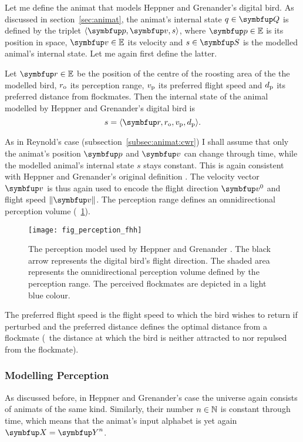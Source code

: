 Let me define the animat that models Heppner and Grenander's digital bird. As discussed in section~\ref{sec:animat}, the animat's internal state $q \in \set{Q}$ is defined by the triplet $\langle \vect{p}, \vect{v}, s \rangle$, where $\vect{p} \in \E$ is its position in space, $\vect{v} \in \E$ its velocity and $s \in \set{S}$ is the modelled animal's internal state. Let me again first define the latter. 

\begin{definition}
	\label{def:animat:s:fhh}
	Let $\vect{r} \in \E$ be the position of the centre of the roosting area of the the modelled bird, $r_\textnormal{o}$ its perception range, $v_\textnormal{p}$ its preferred flight speed and $d_\textnormal{p}$ its preferred distance from flockmates. Then the internal state of the animal modelled by Heppner and Grenander's digital bird is
	\begin{equation}
		s=\langle \vect{r}, r_\textnormal{o}, v_\textnormal{p}, d_\textnormal{p} \rangle.
	\end{equation}
\end{definition}

As in Reynold's case (subsection~\ref{subsec:animat:cwr}) I shall assume that only the animat's position $\vect{p}$ and $\vect{v}$ can change through time, while the 	modelled animal's internal state $s$ stays constant. This is again consistent with Heppner and Grenander's original definition \cite{heppner:1990}. The velocity vector $\vect{v}$ is thus again used to encode the flight direction $\vect{v}^0$ and flight speed $\left\|\vect{v}\right\|$. The perception range defines an omnidirectional perception volume (\fig~\ref{fig:perception:fhh}).

\begin{figure}
	\texttt{[image: fig\_perception\_fhh]}
	\caption{The perception model used by Heppner and Grenander \cite{heppner:1990}. The black arrow represents the digital bird's flight direction. The shaded area represents the omnidirectional perception volume defined by the perception range. The perceived flockmates are depicted in a light blue colour.}
	\label{fig:perception:fhh}
\end{figure}

The preferred flight speed is the flight speed to which the bird wishes to return if perturbed and the preferred distance defines the optimal distance from a flockmate (\ie\ the distance at which the bird is neither attracted to nor repulsed from the flockmate).

\subsubsection{Modelling Perception}
As discussed before, in Heppner and Grenander's case the universe again consists of animats of the same kind. Similarly, their number $n \in \mathbb{N}$ is constant through time, which means that the animat's input alphabet is yet again $\set{X}=\set{Y}^n$.

